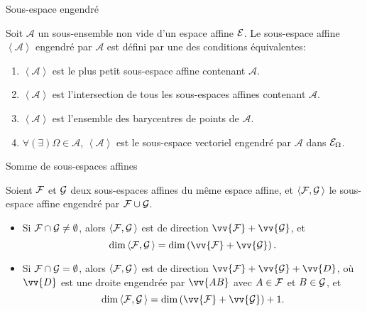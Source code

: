\documentclass[
bigger]{m53beamer}
\begin{document}
  \begin{frame}{Sous-espace engendré}
    \begin{defprop}
      Soit $\mathcal{A}$ un sous-ensemble non vide d'un espace affine $\mathcal{E}$. Le sous-espace affine $\left<\mathcal{A}\right>$ engendré par $\mathcal{A}$ est défini par une des conditions équivalentes:
        \begin{enumerate}[<+(1)->]
          \item $\left<\mathcal{A}\right>$ est le plus petit sous-espace affine contenant $\mathcal{A}$.
          \item $\left<\mathcal{A}\right>$ est l'intersection de tous les sous-espaces affines contenant $\mathcal{A}$.
          \item $\left<\mathcal{A}\right>$ est l'ensemble des barycentres de points de $\mathcal{A}$.
          \item $\forall(\exists) \Omega \in \mathcal{A}$, $\left<\mathcal{A}\right>$ est le sous-espace vectoriel engendré par $\mathcal{A}$ dans $\mathcal{E}_{\Omega}$.
        \end{enumerate}
    \end{defprop}
  \end{frame}
  \begin{frame}{Somme de sous-espaces affines}
    \begin{proposition}
      Soient $\mathcal{F}$ et $\mathcal{G}$ deux sous-espaces affines du même espace affine, et $\left<\mathcal{F},\mathcal{G}\,\right>$ le sous-espace affine engendré par $\mathcal{F} \cup \mathcal{G}$.
      \begin{itemize}[<+(1)->]
        \item Si $\mathcal{F} \cap \mathcal{G} \neq \emptyset$, alors $\left<\mathcal{F},\mathcal{G}\,\right>$ est de direction $\vv{\ens{F}}+\vv{\ens{G}}$\pause, et
            $$
              \dim\left<\ens{F},\ens{G}\,\right> = \dim \left(\vv{\ens{F}}+\vv{\ens{G}}\right).
            $$
        \item Si $\mathcal{F} \cap \mathcal{G} = \emptyset$, alors $\left<\mathcal{F},\mathcal{G}\,\right>$ est de direction $\vv{\ens{F}}+\vv{\ens{G}}+\vv{D}$, où $\vv{D}$ est une droite engendrée par $\vv{AB}$ avec $A \in \mathcal{F}$ et $B \in \mathcal{G}$\pause, et
            $$
              \dim\left<\ens{F},\ens{G}\,\right> = \dim \left(\vv{\ens{F}}+\vv{\ens{G}}\right)+1.
            $$
      \end{itemize}
    \end{proposition}
  \end{frame}
\end{document}
